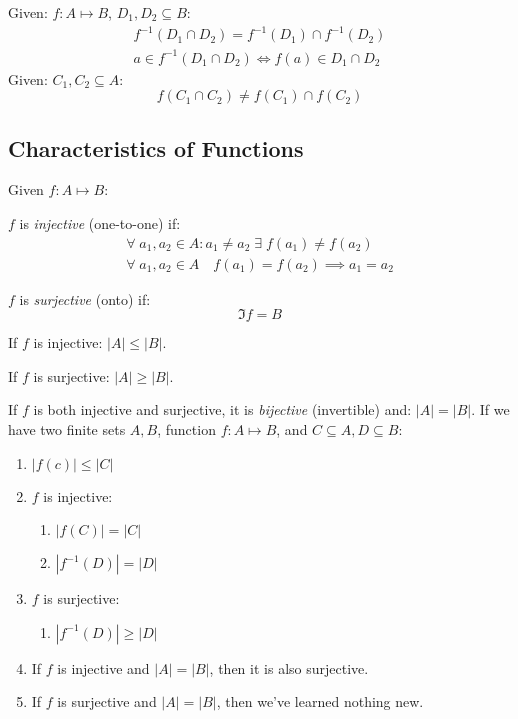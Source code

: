\documentclass[00_complete]{subfiles}
\begin{document}
\begin{claim}
Given: $f: A \mapsto B$, $D_1, D_2 \subseteq B$:
\begin{gather*}
f^{-1}(D_1 \cap D_2) = f^{-1}(D_1) \cap f^{-1}(D_2) \\
a \in f^{-1}(D_1 \cap D_2) \iff f(a) \in D_1 \cap D_2
\end{gather*}
Given: $C_1, C_2 \subseteq A$:
$$f(C_1 \cap C_2) \neq f(C_1) \cap f(C_2)$$
\end{claim}

\subsection{Characteristics of Functions}
Given $f: A \mapsto B$:

$f$ is \emph{injective} (one-to-one) if:
\begin{gather*}
\forall \; a_1,a_2 \in A : a_1 \neq a_2 \; \exists \; f(a_1) \neq f(a_2) \\
\forall \; a_1,a_2 \in A \quad f(a_1) = f(a_2) \implies a_1 = a_2
\end{gather*}

$f$ is \emph{surjective} (onto) if:
$$\Im f = B$$

If $f$ is injective: $|A| \leq |B|$.

If $f$ is surjective: $|A| \geq |B|$.

If $f$ is both injective and surjective, it is \emph{bijective} (invertible) and: $|A| = |B|$.
If we have two finite sets $A, B$, function $f: A \mapsto B$, and $C \subseteq A, D \subseteq B$:
\begin{enumerate}
    \item $|f(c)| \leq |C|$
    \item $f$ is injective:
     \begin{enumerate}
        \item $|f(C)|= |C|$
        \item $|f^{-1}(D)| = |D|$
     \end{enumerate}
    \item $f$ is surjective:
    \begin{enumerate}
        \item $|f^{-1}(D)| \geq |D|$
    \end{enumerate}
    \item If $f$ is injective and $|A|=|B|$, then it is also surjective.
    \item If $f$ is surjective and $|A|=|B|$, then we've learned nothing new.
\end{enumerate}
\end{document}
